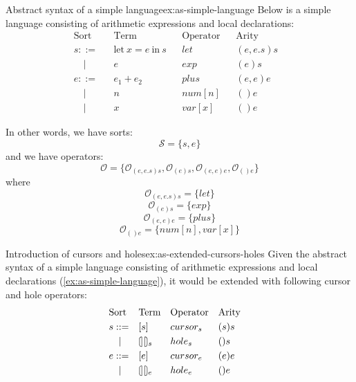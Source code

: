 \begin{example}{Abstract syntax of a simple language}{ex:as-simple-language}
    Below is a simple language consisting of arithmetic expressions and local declarations:
    \[
        \begin{aligned}
                & \text{Sort} &  & \text{Term}                        &  & \text{Operator} &  & \text{Arity} &  & \\
                & s ::=       &  & \text{let} \ x = e \ \text{in} \ s &  & let             &  & (e,e.s)s     &  & \\
                & \quad |     &  & e                                  &  & exp             &  & (e)s         &  & \\
                & e ::=       &  & e_1 + e_2                          &  & plus            &  & (e,e)e       &  & \\
                & \quad |     &  & n                                  &  & num[n]          &  & ()e          &  & \\
                & \quad |     &  & x                                  &  & var[x]          &  & ()e
        \end{aligned}
    \]

    In other words, we have sorts: $$\mathcal{S} = \{ s, e \}$$ and we have operators: $$\mathcal{O} = \{
        \mathcal{O}_{(e,e.s)s}, \mathcal{O}_{(e)s}, \mathcal{O}_{(e,e)e}, \mathcal{O}_{()e}\}$$ where $$\mathcal{O}_{(e,e.s)s} = \{ let \}$$ $$\mathcal{O}_{(e)s} = \{ exp \}$$ $$\mathcal{O}_{(e,e)e} = \{ plus \}$$ $$\mathcal{O}_{()e} = \{ num[n], var[x] \}$$

\end{example}

\begin{example}{Introduction of cursors and holes}{ex:as-extended-cursors-holes}
    Given the abstract syntax of a simple language consisting of arithmetic expressions and local declarations (\cref{ex:as-simple-language}), it would be extended with following cursor and hole operators:
    \[
        \begin{aligned}
             & \text{Sort} &  & \text{Term} &  & \text{Operator} &  & \text{Arity} &  & \\
             & s ::=       &  & [s]         &  & cursor_s        &  & (s)s         &  & \\
             & \quad |     &  & \hole_s     &  & hole_s          &  & ()s          &  & \\
             & e ::=       &  & [e]         &  & cursor_e        &  & (e)e         &  & \\
             & \quad |     &  & \hole_e     &  & hole_e          &  & ()e
        \end{aligned}
    \]
\end{example}

